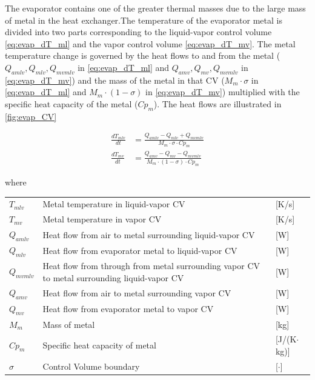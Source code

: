 The evaporator contains one of the greater thermal masses due to the large mass of metal in the heat exchanger.The temperature of the evaporator metal is divided into two parts corresponding to the liquid-vapor control volume \cref{eq:evap_dT_ml} and the vapor control volume \cref{eq:evap_dT_mv}. The metal temperature change is governed by the heat flows to and from the metal ($ Q_{amlv}, Q_{mlv}, Q_{mvmlv} $ in \cref{eq:evap_dT_ml} and $ Q_{amv}, Q_{mv}, Q_{mvmlv} $ in \cref{eq:evap_dT_mv}) and the mass of the metal in that CV ($M_m \cdot \sigma$ in \cref{eq:evap_dT_ml} and $M_m \cdot (1 - \sigma)$ in \cref{eq:evap_dT_mv}) multiplied with the specific heat capacity of the metal ($Cp_m$). The heat flows are illustrated in \cref{fig:evap_CV}

\begin{align}
	\frac{dT_{mlv}}{dt} & = \frac{Q_{amlv}-Q_{mlv} + Q_{mvmlv}}{M_m \cdot \sigma \cdot Cp_m}        \label{eq:evap_dT_ml} \\
	\frac{dT_{mv}}{dt} & = \frac{Q_{amv} - Q_{mv} - Q_{mvmlv}}{M_m \cdot (1 - \sigma) \cdot Cp_m } \label{eq:evap_dT_mv}
\end{align}

where

\begin{center}
	\begin{tabular}{l p{10cm} l}
		$T_{mlv} $  & Metal temperature in liquid-vapor CV                                                        & [\si{K}/\si{s}]                   \\ %
		$T_{mv} $   & Metal temperature in vapor CV                                                               & [\si{K}/\si{s}]                   \\ %
		$Q_{amlv}$  & Heat flow from air to metal surrounding liquid-vapor CV                                     & [\si{W}]                          \\
		$Q_{mlv}$   & Heat flow from evaporator metal to liquid-vapor CV                                          & [\si{W}]                          \\
		$Q_{mvmlv}$ & Heat flow from through from metal surrounding vapor CV to metal surrounding liquid-vapor CV & [\si{W}]                          \\
		$Q_{amv}$   & Heat flow from air to metal surrounding vapor CV                                            & [\si{W}]                          \\
		$Q_{mv}$    & Heat flow from evaporator metal to vapor CV                                                 & [\si{W}]                          \\
		$M_{m} $    & Mass of metal                                                                               & [\si{kg}]                         \\
		$Cp_{m}$    & Specific heat capacity of metal                                                             & [\si{J}/(\si{K}$ \cdot $\si{kg})] \\
		$\sigma$    & Control Volume boundary                                                                     & [$\cdot$]
	\end{tabular}
\end{center}

